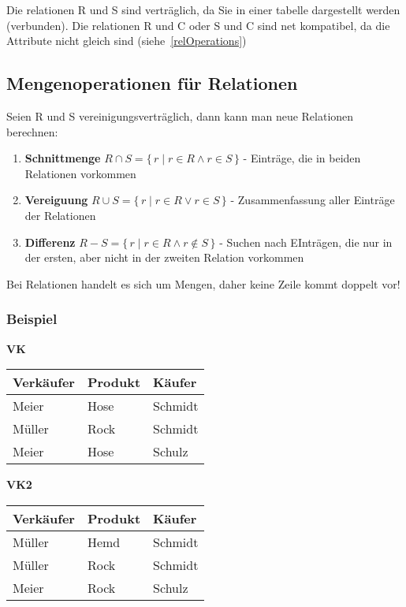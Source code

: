 Die relationen R und S sind verträglich, da Sie in einer tabelle dargestellt werden (verbunden). Die relationen R und C oder S und C sind net kompatibel, da die Attribute nicht gleich sind (siehe~\autoref{relOperations})

\newpage
\subsection{Mengenoperationen für Relationen \label{relOperations}}
Seien R und S vereinigungsverträglich, dann kann man neue Relationen berechnen:
\begin{enumerate}
    \item \textbf{Schnittmenge} $R \cap S = \{\, r \mid r \in R \land r \in S \,\}$ - Einträge, die in beiden Relationen vorkommen
    \item \textbf{Vereiguung} $R \cup S = \{\, r \mid r \in R \lor r \in S \,\}$ - Zusammenfassung aller Einträge der Relationen
    \item \textbf{Differenz} $R - S = \{\, r \mid r \in R \land r \notin S \,\}$ - Suchen nach EInträgen, die nur in der ersten, aber nicht in der zweiten Relation vorkommen
\end{enumerate}
\begin{tcolorbox}[red, title={Hinweis}]
    Bei Relationen handelt es sich um Mengen, daher keine Zeile kommt doppelt vor!
\end{tcolorbox}

\subsubsection{Beispiel}
\begin{table}[H]
    \centering
    \begin{minipage}{0.4\textwidth}
    \centering
    \textbf{VK} \\[3pt]
    \begin{tabularx}{\linewidth}{|X|X|X|}
    \hline
    Verkäufer & Produkt & Käufer \\
    \hline
    Meier & Hose & Schmidt \\
    Müller & Rock & Schmidt \\
    Meier & Hose & Schulz \\
    \hline
    \end{tabularx}
    \end{minipage}
    \hfill
    \begin{minipage}{0.4\textwidth}
    \centering
    \textbf{VK2} \\[3pt]
    \begin{tabularx}{\linewidth}{|X|X|X|}
    \hline
    Verkäufer & Produkt & Käufer \\
    \hline
    Müller & Hemd & Schmidt \\
    Müller & Rock & Schmidt \\
    Meier & Rock & Schulz \\
    \hline
    \end{tabularx}
    \end{minipage}
\end{table}


